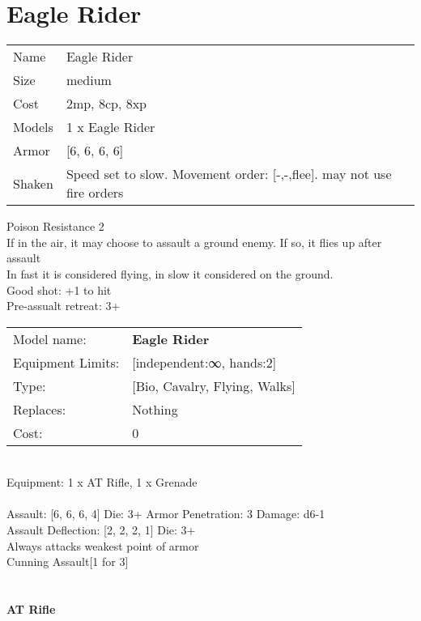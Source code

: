 \pagebreak

\section{ Eagle Rider }

\begin{tabular}{ll}
  Name & Eagle Rider \\
  Size & medium\\
  Cost & 2mp, 8cp, 8xp\\
  Models & 1 x Eagle Rider\\
  Armor & [6, 6, 6, 6]\\
  Shaken & Speed set to slow. Movement order: [-,-,flee]. may not use fire orders\\
\end{tabular}

\noindent Poison Resistance 2\\ 
If in the air, it may choose to assault a ground enemy. If so, it flies up after assault\\ 
In fast it is considered flying, in slow it considered on the ground.\\ 
Good shot: +1 to hit\\ 
Pre-assualt retreat: 3+\\ 


\noindent
\begin{tabular}{ll}
Model name: &{\bf Eagle Rider } \\
Equipment Limits: &[independent:∞, hands:2] \\
Type: &[Bio, Cavalry, Flying, Walks] \\
Replaces: &Nothing \\
Cost: & 0\\
\end{tabular}
\ \\
Equipment: 1 x AT Rifle, 1 x Grenade \\
\ \\
Assault: [6, 6, 6, 4] Die: 3+ Armor Penetration: 3 Damage: d6-1 \\
Assault Deflection: [2, 2, 2, 1] Die: 3+\\
\indent Always attacks weakest point of armor\\ 
Cunning Assault[1 for 3]\\ 
 
\ \\

\ \\
{\bf AT Rifle } \\



